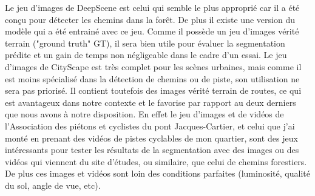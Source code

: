 ﻿\par Le jeu d'images de DeepScene est celui qui semble le plus approprié car il a été conçu pour détecter les chemins dans la forêt. De plus il existe une version du modèle qui a été entrainé avec ce jeu. Comme il possède un jeu d'images vérité terrain ("ground truth" GT), il sera bien utile pour évaluer la segmentation prédite et un gain de temps non négligeable dans le cadre d'un essai. Le jeu d'images de CityScape est très complet pour les scènes urbaines, mais comme il est moins spécialisé dans la détection de chemins ou de piste, son utilisation ne sera pas priorisé. Il contient toutefois des images vérité terrain de routes, ce qui est avantageux dans notre contexte et le favorise par rapport au deux derniers que nous avons à notre disposition. En effet le jeu d'images et de vidéos de l'Association des piétons et cyclistes du pont Jacques-Cartier, et celui que j'ai monté en prenant des vidéos de pistes cyclables de mon quartier, sont des jeux intéressants pour tester les résultats de la segmentation avec des images ou des vidéos qui viennent du site d'études, ou similaire, que celui de chemins forestiers. De plus ces images et vidéos sont loin des conditions parfaites (luminosité, qualité du sol, angle de vue, etc).
